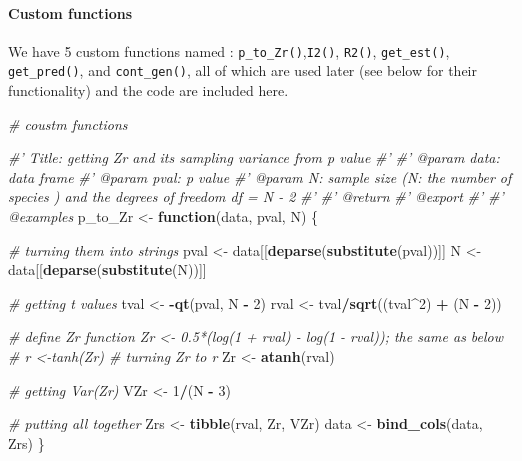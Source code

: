 \documentclass[
]{article}
\newenvironment{Shaded}{\begin{snugshade}}{\end{snugshade}}
\newcommand{\CommentTok}[1]{\textcolor[rgb]{0.56,0.35,0.01}{\textit{#1}}}
\newcommand{\ControlFlowTok}[1]{\textcolor[rgb]{0.13,0.29,0.53}{\textbf{#1}}}
\newcommand{\DecValTok}[1]{\textcolor[rgb]{0.00,0.00,0.81}{#1}}
\newcommand{\KeywordTok}[1]{\textcolor[rgb]{0.13,0.29,0.53}{\textbf{#1}}}
\newcommand{\NormalTok}[1]{#1}
\newcommand{\OperatorTok}[1]{\textcolor[rgb]{0.81,0.36,0.00}{\textbf{#1}}}
\newcommand{\StringTok}[1]{\textcolor[rgb]{0.31,0.60,0.02}{#1}}
\begin{document}
\hypertarget{custom-functions}{%
\paragraph{Custom functions}\label{custom-functions}}

We have 5 custom functions named : \texttt{p\_to\_Zr()},\texttt{I2()},
\texttt{R2()}, \texttt{get\_est()}, \texttt{get\_pred()}, and
\texttt{cont\_gen()}, all of which are used later (see below for their
functionality) and the code are included here.

\begin{Shaded}
\begin{Highlighting}[]
\CommentTok{# coustm functions}

\CommentTok{#' Title: getting Zr and its sampling variance from p value }
\CommentTok{#'}
\CommentTok{#' @param data: data frame }
\CommentTok{#' @param pval: p value}
\CommentTok{#' @param N: sample size (N: the number of species ) and the degrees of freedom df = N - 2}
\CommentTok{#'}
\CommentTok{#' @return}
\CommentTok{#' @export}
\CommentTok{#'}
\CommentTok{#' @examples}
\NormalTok{p_to_Zr <-}\StringTok{ }\ControlFlowTok{function}\NormalTok{(data, pval, N) \{}
    
    \CommentTok{# turning them into strings}
\NormalTok{    pval <-}\StringTok{ }\NormalTok{data[[}\KeywordTok{deparse}\NormalTok{(}\KeywordTok{substitute}\NormalTok{(pval))]]}
\NormalTok{    N <-}\StringTok{ }\NormalTok{data[[}\KeywordTok{deparse}\NormalTok{(}\KeywordTok{substitute}\NormalTok{(N))]]}
    
    \CommentTok{# getting t values}
\NormalTok{    tval <-}\StringTok{ }\OperatorTok{-}\KeywordTok{qt}\NormalTok{(pval, N }\OperatorTok{-}\StringTok{ }\DecValTok{2}\NormalTok{)}
\NormalTok{    rval <-}\StringTok{ }\NormalTok{tval}\OperatorTok{/}\KeywordTok{sqrt}\NormalTok{((tval}\OperatorTok{^}\DecValTok{2}\NormalTok{) }\OperatorTok{+}\StringTok{ }\NormalTok{(N }\OperatorTok{-}\StringTok{ }\DecValTok{2}\NormalTok{))}
    
    \CommentTok{# define Zr function Zr <- 0.5*(log(1 + rval) - log(1 - rval)); the same as below}
    \CommentTok{# r <-tanh(Zr) # turning Zr to r}
\NormalTok{    Zr <-}\StringTok{ }\KeywordTok{atanh}\NormalTok{(rval)}
    
    \CommentTok{# getting Var(Zr)}
\NormalTok{    VZr <-}\StringTok{ }\DecValTok{1}\OperatorTok{/}\NormalTok{(N }\OperatorTok{-}\StringTok{ }\DecValTok{3}\NormalTok{)}
    
    \CommentTok{# putting all together}
\NormalTok{    Zrs <-}\StringTok{ }\KeywordTok{tibble}\NormalTok{(rval, Zr, VZr)}
\NormalTok{    data <-}\StringTok{ }\KeywordTok{bind_cols}\NormalTok{(data, Zrs)}
\NormalTok{\}}


\end{Highlighting}
\end{Shaded}
\end{document}

